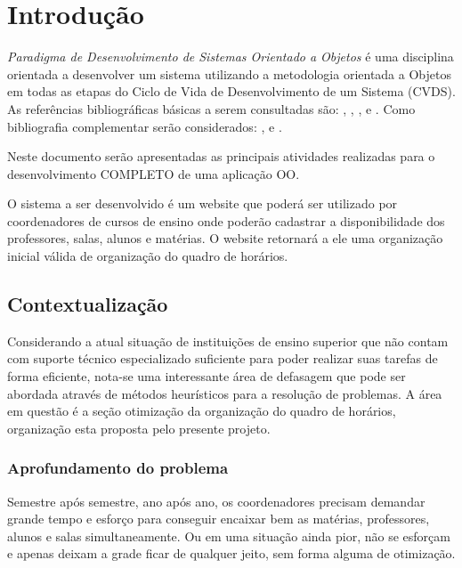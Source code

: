 \chapter{ Introdução}


    \textit{Paradigma de Desenvolvimento de Sistemas Orientado a Objetos} é uma disciplina orientada a desenvolver um sistema utilizando  a metodologia orientada a Objetos em todas as etapas do Ciclo de Vida de Desenvolvimento de um Sistema (CVDS).  As referências bibliográficas básicas a serem consultadas são: \cite{Dennis2014}, \cite{Engholm2013}, \cite{Guedes2011},  \cite{Sommerville2018} e \cite{Wazlawick2011}. Como bibliografia complementar serão considerados: \cite{Satzinger2012}, \cite{Shelly2012} e  \cite{Furgeri2013}.
    
    Neste documento serão apresentadas as principais atividades realizadas para o desenvolvimento COMPLETO de uma aplicação OO.
    
    O sistema a ser desenvolvido é um website que poderá ser utilizado por coordenadores de cursos de ensino onde poderão cadastrar a disponibilidade dos professores, salas, alunos e matérias. O website retornará a ele uma organização inicial válida de organização do quadro de horários.

   \section{Contextualização}

        Considerando a atual situação de instituições de ensino superior que não contam com suporte técnico especializado suficiente para poder realizar suas tarefas de forma eficiente, nota-se uma interessante área de defasagem que pode ser abordada através de métodos heurísticos para a resolução de problemas. A área em questão é a seção otimização da organização do quadro de horários, organização esta proposta pelo presente projeto.

        \subsection{Aprofundamento do problema}

            Semestre após semestre, ano após ano, os coordenadores precisam demandar grande tempo e esforço para conseguir encaixar bem as matérias, professores, alunos e salas simultaneamente. Ou em uma situação ainda pior, não se esforçam e apenas deixam a grade ficar de qualquer jeito, sem forma alguma de otimização.

